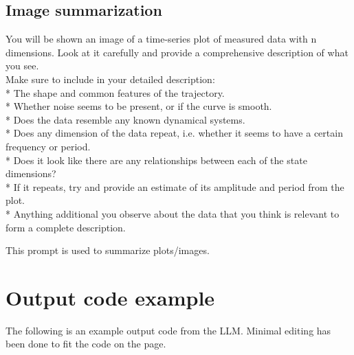 \documentclass{article}
\begin{document}
\subsection{Image summarization}

\begin{prompt}[H]
\begin{tcolorbox}[promptbox, width=\textwidth]
\small
You will be shown an image of a time-series plot of measured data with {n} dimension{s}.
Look at it carefully and provide a comprehensive description of what you see.\\
Make sure to include in your detailed description:\\
* The shape and common features of the trajectory.\\
* Whether noise seems to be present, or if the curve is smooth.\\
* Does the data resemble any known dynamical systems.\\
* Does any dimension of the data repeat, i.e. whether it seems to have a certain frequency or period.\\
* Does it look like there are any relationships between each of the state dimensions?\\
* If it repeats, try and provide an estimate of its amplitude and period from the plot.\\
* Anything additional you observe about the data that you think is relevant to form a complete description.
\end{tcolorbox}
\caption{This prompt is used to summarize plots/images.}
\label{prompt:imagesum}
\end{prompt}



\newpage

\section{Output code example}

The following is an example output code from the LLM.
Minimal editing has been done to fit the code on the page.
\end{document}
